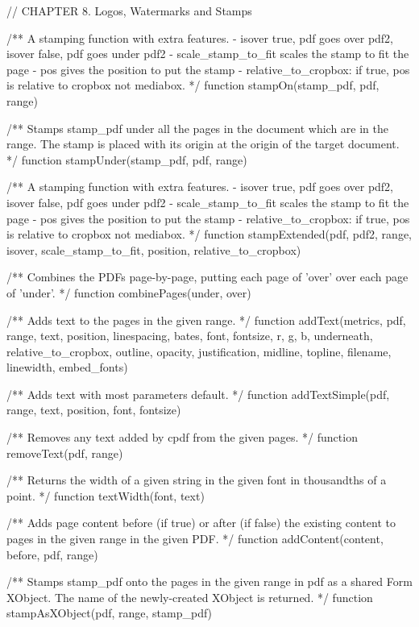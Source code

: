 // CHAPTER 8. Logos, Watermarks and Stamps
   
/** A stamping function with extra features. - isover true, pdf goes over pdf2,
isover false, pdf goes under pdf2 - scale_stamp_to_fit scales the stamp to fit
the page - pos gives the position to put the stamp - relative_to_cropbox: if
true, pos is relative to cropbox not mediabox. */
function stampOn(stamp_pdf, pdf, range)

/** Stamps stamp_pdf under all the pages in the document which are in the
range. The stamp is placed with its origin at the origin of the target
document. */
function stampUnder(stamp_pdf, pdf, range)

/** A stamping function with extra features. - isover true, pdf goes over
pdf2, isover false, pdf goes under pdf2 - scale_stamp_to_fit scales the
stamp to fit the page - pos gives the position to put the stamp -
relative_to_cropbox: if true, pos is relative to cropbox not mediabox. */
function stampExtended(pdf, pdf2, range, isover, scale_stamp_to_fit, position,
                       relative_to_cropbox)

/** Combines the PDFs page-by-page, putting each page of 'over' over each page
of 'under'. */
function combinePages(under, over)

/** Adds text to the pages in the given range. */
function addText(metrics, pdf, range, text, position, linespacing,
                 bates, font, fontsize, r, g, b, underneath, relative_to_cropbox,
                 outline, opacity, justification, midline, topline, filename,
                 linewidth, embed_fonts)

/** Adds text with most parameters default. */
function addTextSimple(pdf, range, text, position, font, fontsize)

/** Removes any text added by cpdf from the given pages. */
function removeText(pdf, range)

/** Returns the width of a given string in the given font in thousandths of a
point. */
function textWidth(font, text)

/** Adds page content before (if true) or after (if false) the existing
content to pages in the given range in the given PDF. */
function addContent(content, before, pdf, range)

/** Stamps stamp_pdf onto the pages in the given range in pdf as a shared Form
XObject. The name of the newly-created XObject is returned. */
function stampAsXObject(pdf, range, stamp_pdf)
